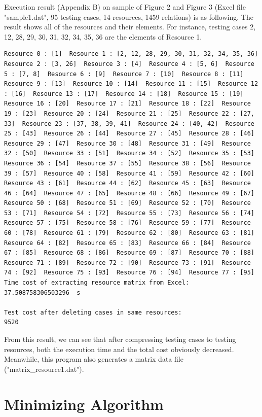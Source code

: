 \documentclass[12pt,a4paper]{article}
\begin{document}
Execution result (Appendix B) on sample of Figure 2 and Figure 3 (Excel file "sample1.dat", 95 testing cases, 14 resources, 1459 relations) is as following. The result shows all of the resources and their elements. For instance, testing cases 2, 12, 28, 29, 30, 31, 32, 34, 35, 36 are the elements of Resource 1.

\begin{lstlisting}
Resource 0 : [1]  Resource 1 : [2, 12, 28, 29, 30, 31, 32, 34, 35, 36]  Resource 2 : [3, 26]  Resource 3 : [4]  Resource 4 : [5, 6]  Resource 5 : [7, 8]  Resource 6 : [9]  Resource 7 : [10]  Resource 8 : [11]  Resource 9 : [13]  Resource 10 : [14]  Resource 11 : [15]  Resource 12 : [16]  Resource 13 : [17]  Resource 14 : [18]  Resource 15 : [19]  Resource 16 : [20]  Resource 17 : [21]  Resource 18 : [22]  Resource 19 : [23]  Resource 20 : [24]  Resource 21 : [25]  Resource 22 : [27, 33]  Resource 23 : [37, 38, 39, 41]  Resource 24 : [40, 42]  Resource 25 : [43]  Resource 26 : [44]  Resource 27 : [45]  Resource 28 : [46]  Resource 29 : [47]  Resource 30 : [48]  Resource 31 : [49]  Resource 32 : [50]  Resource 33 : [51]  Resource 34 : [52]  Resource 35 : [53]  Resource 36 : [54]  Resource 37 : [55]  Resource 38 : [56]  Resource 39 : [57]  Resource 40 : [58]  Resource 41 : [59]  Resource 42 : [60]  Resource 43 : [61]  Resource 44 : [62]  Resource 45 : [63]  Resource 46 : [64]  Resource 47 : [65]  Resource 48 : [66]  Resource 49 : [67]  Resource 50 : [68]  Resource 51 : [69]  Resource 52 : [70]  Resource 53 : [71]  Resource 54 : [72]  Resource 55 : [73]  Resource 56 : [74]  Resource 57 : [75]  Resource 58 : [76]  Resource 59 : [77]  Resource 60 : [78]  Resource 61 : [79]  Resource 62 : [80]  Resource 63 : [81]  Resource 64 : [82]  Resource 65 : [83]  Resource 66 : [84]  Resource 67 : [85]  Resource 68 : [86]  Resource 69 : [87]  Resource 70 : [88]  Resource 71 : [89]  Resource 72 : [90]  Resource 73 : [91]  Resource 74 : [92]  Resource 75 : [93]  Resource 76 : [94]  Resource 77 : [95]  
Time cost of extracting resource matrix from Excel:
37.508758306503296  s

Test cost after deleting cases in same resources:
9520
\end{lstlisting}

From this result, we can see that after compressing testing cases to testing resources, both the execution time and the total cost obviously decreased. Meanwhile, this program also generates a matrix data file ("matrix\_resource1.dat").

\section{Minimizing Algorithm}
\end{document}
